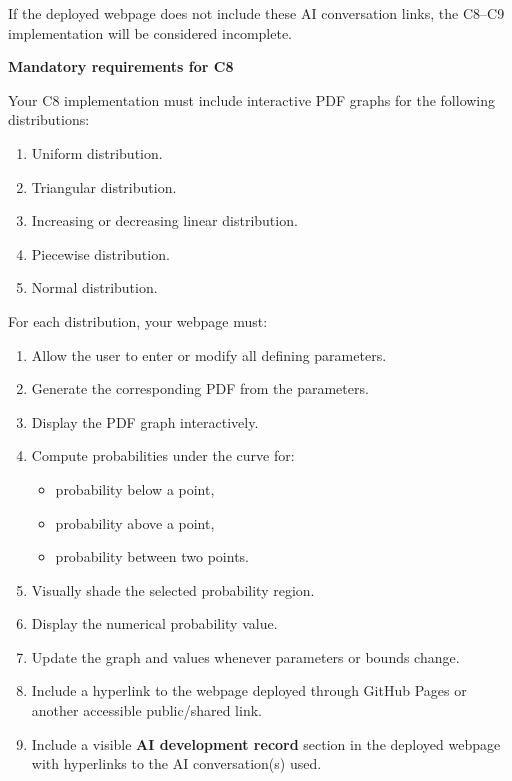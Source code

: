 \documentclass[12pt]{article}
\newcommand{\SubsectionBox}[1]{%
	\noindent\colorbox{gray!30}{%
		\parbox{\linewidth}{\textbf{#1}}%
	}\par\vspace{0.35cm}%
}
\begin{document}
	If the deployed webpage does not include these AI conversation links, the C8--C9 implementation will be considered incomplete.
	
	\SubsectionBox{Mandatory requirements for C8}
	Your C8 implementation must include interactive PDF graphs for the following distributions:
	\begin{enumerate}
		\item Uniform distribution.
		\item Triangular distribution.
		\item Increasing or decreasing linear distribution.
		\item Piecewise distribution.
		\item Normal distribution.
	\end{enumerate}
	
	For each distribution, your webpage must:
	\begin{enumerate}
		\item Allow the user to enter or modify all defining parameters.
		\item Generate the corresponding PDF from the parameters.
		\item Display the PDF graph interactively.
		\item Compute probabilities under the curve for:
		\begin{itemize}
			\item probability below a point,
			\item probability above a point,
			\item probability between two points.
		\end{itemize}
		\item Visually shade the selected probability region.
		\item Display the numerical probability value.
		\item Update the graph and values whenever parameters or bounds change.
		\item Include a hyperlink to the webpage deployed through GitHub Pages or another accessible public/shared link.
		\item Include a visible \textbf{AI development record} section in the deployed webpage with hyperlinks to the AI conversation(s) used.
	\end{enumerate}
	
\end{document}
